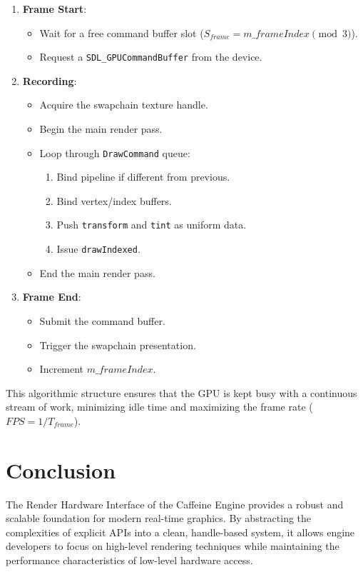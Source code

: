 \begin{enumerate}
    \item \textbf{Frame Start}:
    \begin{itemize}
        \item Wait for a free command buffer slot ($S_{frame} = m\_frameIndex \pmod{3}$).
        \item Request a \texttt{SDL\_GPUCommandBuffer} from the device.
    \end{itemize}
    \item \textbf{Recording}:
    \begin{itemize}
        \item Acquire the swapchain texture handle.
        \item Begin the main render pass.
        \item Loop through \texttt{DrawCommand} queue:
        \begin{enumerate}
            \item Bind pipeline if different from previous.
            \item Bind vertex/index buffers.
            \item Push \texttt{transform} and \texttt{tint} as uniform data.
            \item Issue \texttt{drawIndexed}.
        \end{enumerate}
        \item End the main render pass.
    \end{itemize}
    \item \textbf{Frame End}:
    \begin{itemize}
        \item Submit the command buffer.
        \item Trigger the swapchain presentation.
        \item Increment $m\_frameIndex$.
    \end{itemize}
\end{enumerate}

This algorithmic structure ensures that the GPU is kept busy with a continuous stream of work, minimizing idle time and maximizing the frame rate ($FPS = 1 / T_{frame}$).

\section{Conclusion}

The Render Hardware Interface of the Caffeine Engine provides a robust and scalable foundation for modern real-time graphics. By abstracting the complexities of explicit APIs into a clean, handle-based system, it allows engine developers to focus on high-level rendering techniques while maintaining the performance characteristics of low-level hardware access.
